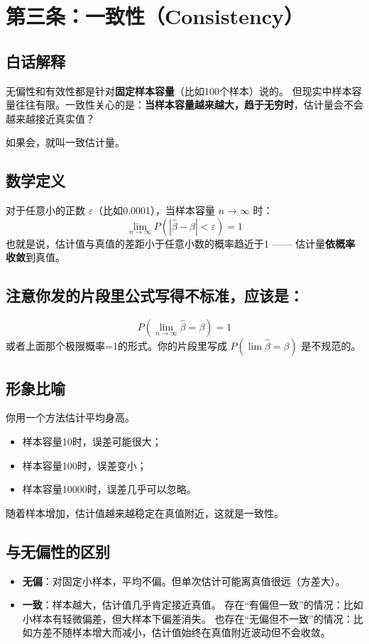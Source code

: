 \documentclass[a4paper,12pt]{article}
\begin{document}
\section{第三条：一致性（Consistency）}

\subsection*{白话解释}
无偏性和有效性都是针对\textbf{固定样本容量}（比如100个样本）说的。  
但现实中样本容量往往有限。一致性关心的是：\textbf{当样本容量越来越大，趋于无穷时}，估计量会不会越来越接近真实值？

如果会，就叫一致估计量。

\subsection*{数学定义}
对于任意小的正数 \(\varepsilon\)（比如0.0001），当样本容量 \(n \to \infty\) 时：
\[
\lim_{n \to \infty} P\left( |\hat{\beta} - \beta| < \varepsilon \right) = 1
\]
也就是说，估计值与真值的差距小于任意小数的概率趋近于1 —— 估计量\textbf{依概率收敛}到真值。

\subsection*{注意你发的片段里公式写得不标准，应该是：}
\[
P\left( \lim_{n \to \infty} \hat{\beta} = \beta \right) = 1
\]
或者上面那个极限概率=1的形式。你的片段里写成 \(P(\lim \hat{\beta} = \beta)\) 是不规范的。

\subsection*{形象比喻}
你用一个方法估计平均身高。  
\begin{itemize}
    \item 样本容量10时，误差可能很大；  
    \item 样本容量100时，误差变小；  
    \item 样本容量10000时，误差几乎可以忽略。  
\end{itemize}
随着样本增加，估计值越来越稳定在真值附近，这就是一致性。

\subsection*{与无偏性的区别}
\begin{itemize}
    \item \textbf{无偏}：对固定小样本，平均不偏。但单次估计可能离真值很远（方差大）。  
    \item \textbf{一致}：样本越大，估计值几乎肯定接近真值。  
    存在“有偏但一致”的情况：比如小样本有轻微偏差，但大样本下偏差消失。  
    也存在“无偏但不一致”的情况：比如方差不随样本增大而减小，估计值始终在真值附近波动但不会收敛。
\end{itemize}
\end{document}
